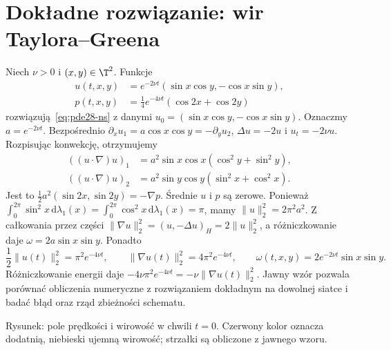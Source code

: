 \section{Dokładne rozwiązanie: wir Taylora--Greena}
\begin{przyklad}
\label{ex:pde28-TG}
Niech $\nu>0$ i $(x,y)\in\T^2$. Funkcje
\begin{align*}
 u(t,x,y)&=e^{-2\nu t}(\sin x\cos y,-\cos x\sin y),\\
 p(t,x,y)&=\tfrac14e^{-4\nu t}(\cos 2x+\cos 2y)
\end{align*}
rozwiązują~\eqref{eq:pde28-ns} z danymi
$u_0=(\sin x\cos y,-\cos x\sin y)$.
Oznaczmy $a=e^{-2\nu t}$. Bezpośrednio
$\partial_xu_1=a\cos x\cos y=-\partial_yu_2$,
$\Delta u=-2u$ i $u_t=-2\nu u$.
Rozpisując konwekcję, otrzymujemy
\[
 \begin{aligned}
 ((u\cdot\nabla)u)_1
 &=a^2\sin x\cos x(\cos^2y+\sin^2y),\\
 ((u\cdot\nabla)u)_2
 &=a^2\sin y\cos y(\sin^2x+\cos^2x).
 \end{aligned}
\]
Jest to $\frac12a^2(\sin2x,\sin2y)=-\nabla p$.
Średnie $u$ i $p$ są zerowe. Ponieważ
$\int_0^{2\pi}\sin^2x\,\mathrm d\lambda_1(x)
=\int_0^{2\pi}\cos^2x\,\mathrm d\lambda_1(x)=\pi$,
mamy $\|u\|_2^2=2\pi^2a^2$.
Z całkowania przez części
$\|\nabla u\|_2^2=(u,-\Delta u)_H=2\|u\|_2^2$,
a różniczkowanie daje $\omega=2a\sin x\sin y$.
Ponadto
\[
 \frac12\|u(t)\|_2^2=\pi^2e^{-4\nu t},\qquad
 \|\nabla u(t)\|_2^2=4\pi^2e^{-4\nu t},\qquad
 \omega(t,x,y)=2e^{-2\nu t}\sin x\sin y.
\]
Różniczkowanie energii daje
$-4\nu\pi^2e^{-4\nu t}=-\nu\|\nabla u(t)\|_2^2$.
Jawny wzór pozwala porównać obliczenia numeryczne
z rozwiązaniem dokładnym na dowolnej siatce
i badać błąd oraz rząd zbieżności schematu.

\begin{center}

{\small Rysunek: pole prędkości i wirowość w chwili $t=0$.
Czerwony kolor oznacza dodatnią, niebieski ujemną wirowość;
strzałki są obliczone z jawnego wzoru.}
\end{center}
\end{przyklad}


